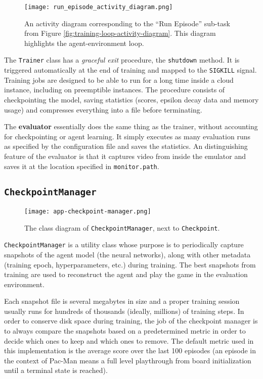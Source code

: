 \begin{figure}
    \centering
    \texttt{[image: run\_episode\_activity\_diagram.png]}
    \caption{An activity diagram corresponding to the ``Run Episode'' sub-task from Figure \ref{fig:training-loop-activity-diagram}. This diagram highlights the agent-environment loop.}
    \label{fig:run-episode-diagram}
\end{figure}

The \texttt{Trainer} class has a \emph{graceful exit} procedure, the \texttt{shutdown} method.
It is triggered automatically at the end of training and mapped to the \texttt{SIGKILL} signal.
Training jobs are designed to be able to run for a long time inside a cloud instance, including on preemptible instances\footnotemark{}.
The procedure consists of checkpointing the model, saving statistics (scores, epsilon decay data and memory usage) and compresses everything into a file before terminating.

The \textbf{evaluator} essentially does the same thing as the trainer, without accounting for checkpointing or agent learning.
It simply executes as many evaluation runs as specified by the configuration file and saves the statistics.
An distinguishing feature of the evaluator is that it captures video from inside the emulator and saves it at the location specified in \texttt{monitor.path}.

\subsection{\texttt{CheckpointManager}}

\begin{figure}[ht]
    \centering
    \texttt{[image: app-checkpoint-manager.png]}
    \caption{The class diagram of \texttt{CheckpointManager}, next to \texttt{Checkpoint}.}
    \label{fig:checkpoint-manager}
\end{figure}

\texttt{CheckpointManager} is a utility class whose purpose is to periodically capture snapshots of the agent model (the neural networks), along with other metadata (training epoch, hyperparameters, etc.) during training.
The best snapshots from training are used to reconstruct the agent and play the game in the evaluation environment.

Each snapshot file is several megabytes in size and a proper training session usually runs for hundreds of thousands (ideally, millions) of training steps.
In order to conserve disk space during training, the job of the checkpoint manager is to always compare the snapshots based on a predetermined metric in order to decide which ones to keep and which ones to remove.
The default metric used in this implementation is the average score over the last 100 episodes (an episode in the context of Pac-Man means a full level playthrough from board initialization until a terminal state is reached).

